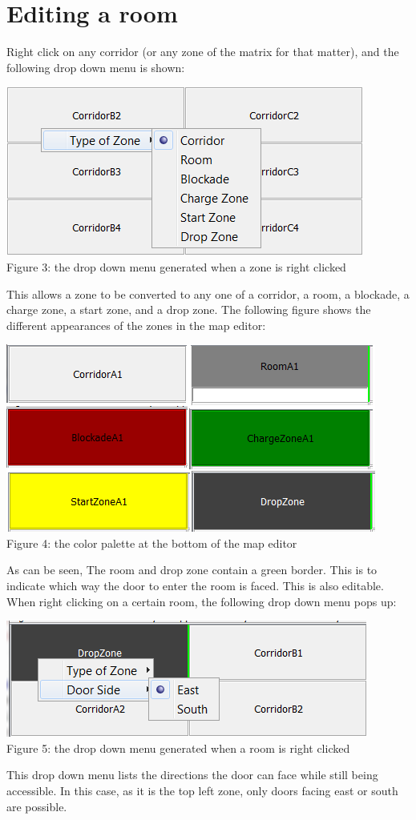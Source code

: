 \documentclass[]{article}
\begin{document}
\section*{Editing a room}
Right click on any corridor (or any zone of the matrix for that matter), and the following drop down menu is shown:
\begin{center}
	\centering
	\includegraphics[scale=0.55]{DropDownMenuRoom.png}\\
	Figure 3: the drop down menu generated when a zone is right clicked
\end{center}
This allows a zone to be converted to any one of a corridor, a room, a blockade, a charge zone, a start zone, and a drop zone. The following figure shows the different appearances of the zones in the map editor:
\begin{center}
	\centering
	\includegraphics{DifferentRooms.png}\\
	Figure 4: the color palette at the bottom of the map editor
\end{center}
As can be seen, The room and drop zone contain a green border. This is to indicate which way the door to enter the room is faced. This is also editable. When right clicking on a certain room, the following drop down menu pops up:
\begin{center}
	\centering
	\includegraphics{DropDownMenuRoom2.png}\\
	Figure 5: the drop down menu generated when a room is right clicked
\end{center}
This drop down menu lists the directions the door can face while still being accessible. In this case, as it is the top left zone, only doors facing east or south are possible.
\end{document}
